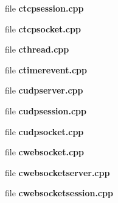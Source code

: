 \begin{DoxyCompactItemize}
\begin{DoxyCompactList}
 \end{DoxyCompactList}\item 
file {\bf ctcpsession.\+cpp}
\begin{DoxyCompactList}\small\item\em 

 \end{DoxyCompactList}\item 
file {\bf ctcpsocket.\+cpp}
\begin{DoxyCompactList}\small\item\em 

 \end{DoxyCompactList}\item 
file {\bf cthread.\+cpp}
\item 
file {\bf ctimerevent.\+cpp}
\item 
file {\bf cudpserver.\+cpp}
\item 
file {\bf cudpsession.\+cpp}
\item 
file {\bf cudpsocket.\+cpp}
\item 
file {\bf cwebsocket.\+cpp}
\item 
file {\bf cwebsocketserver.\+cpp}
\begin{DoxyCompactList}\small\item\em 

 \end{DoxyCompactList}\item 
file {\bf cwebsocketsession.\+cpp}
\begin{DoxyCompactList}\small\item\em 

 \end{DoxyCompactList}\end{DoxyCompactItemize}
